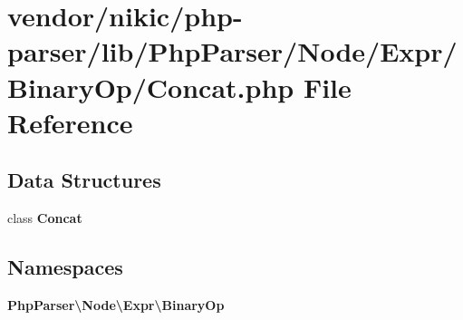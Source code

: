 \section{vendor/nikic/php-\/parser/lib/\+Php\+Parser/\+Node/\+Expr/\+Binary\+Op/\+Concat.php File Reference}
\label{_binary_op_2_concat_8php}
\subsection*{Data Structures}
\begin{DoxyCompactItemize}
\item 
class {\bf Concat}
\end{DoxyCompactItemize}
\subsection*{Namespaces}
\begin{DoxyCompactItemize}
\item 
 {\bf Php\+Parser\textbackslash{}\+Node\textbackslash{}\+Expr\textbackslash{}\+Binary\+Op}
\end{DoxyCompactItemize}
